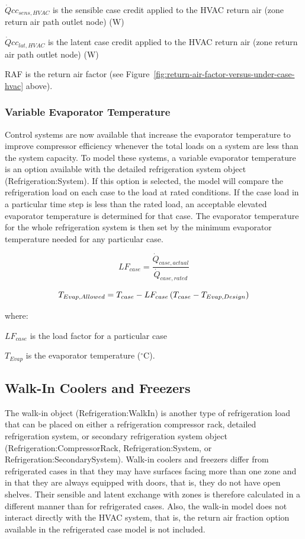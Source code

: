\(\dot Qc{c_{sens,HVAC}}\) is the sensible case credit applied to the HVAC return air (zone return air path outlet node) (W)

\(\dot Qc{c_{lat,HVAC}}\) is the latent case credit applied to the HVAC return air (zone return air path outlet node) (W)

RAF is the return air factor (see Figure~\ref{fig:return-air-factor-versus-under-case-hvac} above).

\subsubsection{Variable Evaporator Temperature}\label{variable-evaporator-temperature}

Control systems are now available that increase the evaporator temperature to improve compressor efficiency whenever the total loads on a system are less than the system capacity. To model these systems, a variable evaporator temperature is an option available with the detailed refrigeration system object (Refrigeration:System). If this option is selected, the model will compare the refrigeration load on each case to the load at rated conditions. If the case load in a particular time step is less than the rated load, an acceptable elevated evaporator temperature is determined for that case. The evaporator temperature for the whole refrigeration system is then set by the minimum evaporator temperature needed for any particular case.

\begin{equation}
  LF_{case} = \frac{\dot{Q}_{case,actual}}{\dot{Q}_{case,rated}}
\end{equation}

\begin{equation}
  T_{Evap,Allowed} = T_{case} - LF_{case}\left(T_{case} - T_{Evap,Design}\right)
\end{equation}

where:

\(LF_{case}\) is the load factor for a particular case

\(T_{Evap}\) is the evaporator temperature (\(^{\circ}\)C).

\subsection{Walk-In Coolers and Freezers}\label{walk-in-coolers-and-freezers}

The walk-in object (Refrigeration:WalkIn) is another type of refrigeration load that can be placed on either a refrigeration compressor rack, detailed refrigeration system, or secondary refrigeration system object (Refrigeration:CompressorRack, Refrigeration:System, or Refrigeration:SecondarySystem). Walk-in coolers and freezers differ from refrigerated cases in that they may have surfaces facing more than one zone and in that they are always equipped with doors, that is, they do not have open shelves. Their sensible and latent exchange with zones is therefore calculated in a different manner than for refrigerated cases. Also, the walk-in model does not interact directly with the HVAC system, that is, the return air fraction option available in the refrigerated case model is not included.

